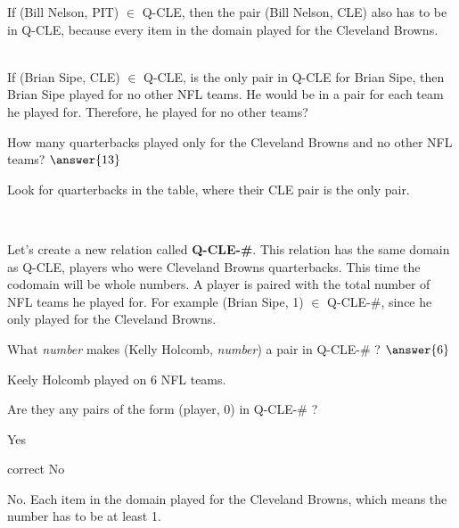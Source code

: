 \documentclass{ximera}
\begin{document}
\begin{fact}

If (Bill Nelson, PIT) $\in$ Q-CLE, then the pair (Bill Nelson, CLE) also has to be in Q-CLE, because every item in the domain played for the Cleveland Browns.

\quad \\

If (Brian Sipe, CLE) $\in$ Q-CLE, is the only pair in Q-CLE for Brian Sipe, then Brian Sipe played for no other NFL teams.  He would be in a pair for each team he played for. Therefore, he played for no other teams?



\begin{problem} How many quarterbacks played only for the Cleveland Browns and no other NFL teams? $\answer{13}$
\begin{feedback}
Look for quarterbacks in the table, where their CLE pair is the only pair.
\end{feedback}
\end{problem}


\end{fact}


\quad \\


\begin{example}
Let's create a new relation called \textbf{Q-CLE-\#}. This relation has the same domain as Q-CLE, players who were Cleveland Browns quarterbacks. This time the codomain will be whole numbers. A player is paired with the total number of NFL teams he played for.
For example (Brian Sipe, 1) $\in$ Q-CLE-\#, since he only played for the Cleveland Browns.


\begin{problem} 
What \textit{number} makes (Kelly Holcomb, \textit{number}) a pair in Q-CLE-\# ? $\answer{6}$
\begin{feedback}
Keely Holcomb played on 6 NFL teams.
\end{feedback}
\end{problem}



Are they any pairs of the form (player, 0) in Q-CLE-\# ?
\begin{multipleChoice} 
\item{Yes}
\item[correct]{No}
\end{multipleChoice}
\begin{feedback}
No. Each item in the domain played for the Cleveland Browns, which means the number has to be at least 1.
\end{feedback}

\end{example}
\end{document}
